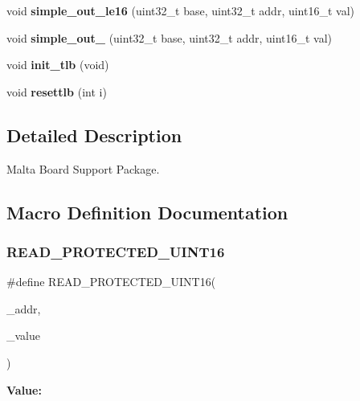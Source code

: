 \begin{DoxyCompactItemize}
\mbox{\label{group__RTEMSBSPsMIPSMalta_ga9c7c317308b2dc53d47440d21bf95cf0}} 
void {\bfseries simple\+\_\+out\+\_\+le16} (uint32\+\_\+t base, uint32\+\_\+t addr, uint16\+\_\+t val)
\item 
\mbox{\label{group__RTEMSBSPsMIPSMalta_ga415a130e3de7ad227139ec967ae1d6ca}} 
void {\bfseries simple\+\_\+out\+\_} (uint32\+\_\+t base, uint32\+\_\+t addr, uint16\+\_\+t val)
\item 
\mbox{\label{group__RTEMSBSPsMIPSMalta_gacb3eb371c98c83f4058d92f3e0bb74a8}} 
void {\bfseries init\+\_\+tlb} (void)
\item 
\mbox{\label{group__RTEMSBSPsMIPSMalta_ga5aac3896e936d66009fe668385795a58}} 
void {\bfseries resettlb} (int i)
\end{DoxyCompactItemize}


\subsection{Detailed Description}
Malta Board Support Package. 



\subsection{Macro Definition Documentation}
\mbox{\label{group__RTEMSBSPsMIPSMalta_ga019408201f33d49e498f671ec05c1a02}} 
\subsubsection{\texorpdfstring{READ\_PROTECTED\_UINT16}{READ\_PROTECTED\_UINT16}}
{\footnotesize\ttfamily \#define R\+E\+A\+D\+\_\+\+P\+R\+O\+T\+E\+C\+T\+E\+D\+\_\+\+U\+I\+N\+T16(\begin{DoxyParamCaption}\item[{}]{\+\_\+addr,  }\item[{}]{\+\_\+value }\end{DoxyParamCaption})}

{\bfseries Value\+:}
\begin{DoxyCode}{0}
\DoxyCodeLine{\textcolor{keywordflow}{do} \{ \(\backslash\)}
\DoxyCodeLine{        \}}

\end{DoxyCode}
\mbox{\label{group__RTEMSBSPsMIPSMalta_ga1f4b3664444654f278d3dc05b85669ff}} 
